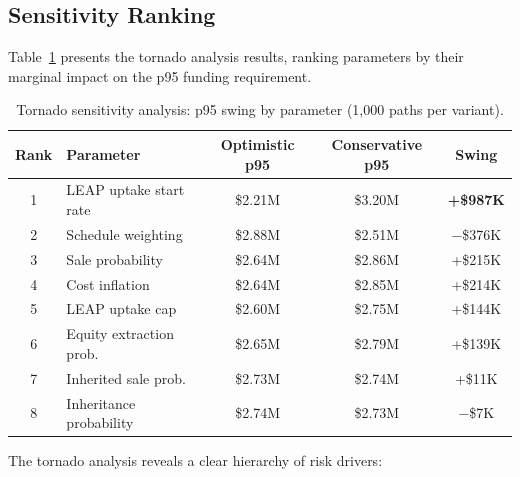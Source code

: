 \documentclass[11pt, letterpaper]{article}
\begin{document}
\subsection{Sensitivity Ranking}

Table~\ref{tab:tornado} presents the tornado analysis results, ranking parameters by their marginal impact on the p95 funding requirement.

\begin{table}[H]
  \centering
  \caption{Tornado sensitivity analysis: p95 swing by parameter (1{,}000 paths per variant).}
  \label{tab:tornado}
  \begin{tabular}{@{}clccc@{}}
    \toprule
    \textbf{Rank} & \textbf{Parameter} & \textbf{Optimistic p95} & \textbf{Conservative p95} & \textbf{Swing} \\
    \midrule
    1 & LEAP uptake start rate & \$2.21M & \$3.20M & \textbf{+\$987K} \\
    2 & Schedule weighting & \$2.88M & \$2.51M & $-$\$376K \\
    3 & Sale probability & \$2.64M & \$2.86M & +\$215K \\
    4 & Cost inflation & \$2.64M & \$2.85M & +\$214K \\
    5 & LEAP uptake cap & \$2.60M & \$2.75M & +\$144K \\
    6 & Equity extraction prob. & \$2.65M & \$2.79M & +\$139K \\
    7 & Inherited sale prob. & \$2.73M & \$2.74M & +\$11K \\
    8 & Inheritance probability & \$2.74M & \$2.73M & $-$\$7K \\
    \bottomrule
  \end{tabular}
\end{table}

The tornado analysis reveals a clear hierarchy of risk drivers:
\end{document}
